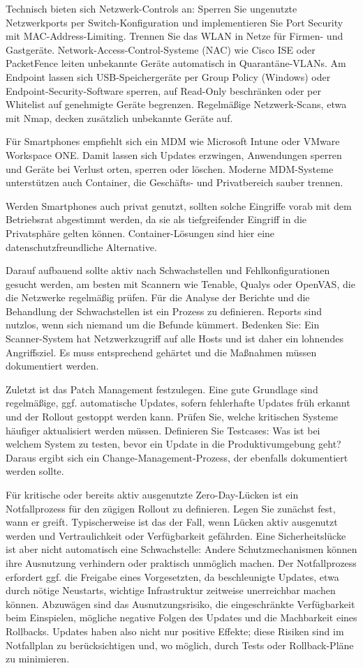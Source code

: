Technisch bieten sich Netzwerk-Controls an: Sperren Sie ungenutzte Netzwerkports per Switch-Konfiguration und implementieren Sie Port Security mit MAC-Address-Limiting. Trennen Sie das WLAN in Netze für Firmen- und Gastgeräte. Network-Access-Control-Systeme (NAC) wie Cisco ISE oder PacketFence leiten unbekannte Geräte automatisch in Quarantäne-VLANs.
Am Endpoint lassen sich USB-Speichergeräte per Group Policy (Windows) oder Endpoint-Security-Software sperren, auf Read-Only beschränken oder per Whitelist auf genehmigte Geräte begrenzen. Regelmäßige Netzwerk-Scans, etwa mit Nmap, decken zusätzlich unbekannte Geräte auf.

Für Smartphones empfiehlt sich ein MDM wie Microsoft Intune oder VMware Workspace ONE. Damit lassen sich Updates erzwingen, Anwendungen sperren und Geräte bei Verlust orten, sperren oder löschen. Moderne MDM-Systeme unterstützen auch Container, die Geschäfts- und Privatbereich sauber trennen.

Werden Smartphones auch privat genutzt, sollten solche Eingriffe vorab mit dem Betriebsrat abgestimmt werden, da sie als tiefgreifender Eingriff in die Privatsphäre gelten können. Container-Lösungen sind hier eine datenschutzfreundliche Alternative.

Darauf aufbauend sollte aktiv nach Schwachstellen und Fehlkonfigurationen gesucht werden, am besten mit Scannern wie Tenable, Qualys oder OpenVAS, die die Netzwerke regelmäßig prüfen. Für die Analyse der Berichte und die Behandlung der Schwachstellen ist ein Prozess zu definieren. Reports sind nutzlos, wenn sich niemand um die Befunde kümmert. Bedenken Sie: Ein Scanner-System hat Netzwerkzugriff auf alle Hosts und ist daher ein lohnendes Angriffsziel. Es muss entsprechend gehärtet und die Maßnahmen müssen dokumentiert werden.

Zuletzt ist das Patch Management festzulegen. Eine gute Grundlage sind regelmäßige, ggf. automatische Updates, sofern fehlerhafte Updates früh erkannt und der Rollout gestoppt werden kann. Prüfen Sie, welche kritischen Systeme häufiger aktualisiert werden müssen. Definieren Sie Testcases: Was ist bei welchem System zu testen, bevor ein Update in die Produktivumgebung geht? Daraus ergibt sich ein Change-Management-Prozess, der ebenfalls dokumentiert werden sollte.

Für kritische oder bereits aktiv ausgenutzte Zero-Day-Lücken ist ein Notfallprozess für den zügigen Rollout zu definieren. Legen Sie zunächst fest, wann er greift. Typischerweise ist das der Fall, wenn Lücken aktiv ausgenutzt werden und Vertraulichkeit oder Verfügbarkeit gefährden. Eine Sicherheitslücke ist aber nicht automatisch eine Schwachstelle: Andere Schutzmechanismen können ihre Ausnutzung verhindern oder praktisch unmöglich machen. Der Notfallprozess erfordert ggf. die Freigabe eines Vorgesetzten, da beschleunigte Updates, etwa durch nötige Neustarts, wichtige Infrastruktur zeitweise unerreichbar machen können. Abzuwägen sind das Ausnutzungsrisiko, die eingeschränkte Verfügbarkeit beim Einspielen, mögliche negative Folgen des Updates und die Machbarkeit eines Rollbacks. Updates haben also nicht nur positive Effekte; diese Risiken sind im Notfallplan zu berücksichtigen und, wo möglich, durch Tests oder Rollback-Pläne zu minimieren.
\newpage
